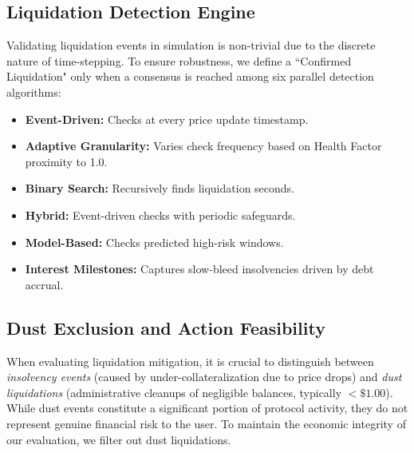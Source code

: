\documentclass[manuscript,screen,review]{acmart}
\begin{document}
\subsection{Liquidation Detection Engine}

\label{sec:liq}
Validating liquidation events in simulation is non-trivial due to the discrete nature of time-stepping. To ensure robustness, we define a ``Confirmed Liquidation" only when a consensus is reached among six parallel detection algorithms:
\begin{itemize}
    \item \textbf{Event-Driven:} Checks at every price update timestamp.
    \item \textbf{Adaptive Granularity:} Varies check frequency based on Health Factor proximity to 1.0.
    \item \textbf{Binary Search:} Recursively finds liquidation seconds.
    \item \textbf{Hybrid:} Event-driven checks with periodic safeguards.
    \item \textbf{Model-Based:} Checks predicted high-risk windows.
    \item \textbf{Interest Milestones:} Captures slow-bleed insolvencies driven by debt accrual.
\end{itemize}


\subsection{Dust Exclusion and Action Feasibility}

When evaluating liquidation mitigation, it is crucial to distinguish between \emph{insolvency events} (caused by under-collateralization due to price drops) and \emph{dust liquidations} (administrative cleanups of negligible balances, typically $<\$1.00$). While dust events constitute a significant portion of protocol activity, they do not represent genuine financial risk to the user. To maintain the economic integrity of our evaluation, we filter out dust liquidations.
\end{document}
